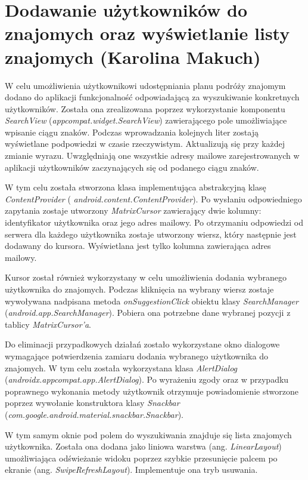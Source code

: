 \documentclass[10pt,twoside,a4paper]{report}
\begin{document}
\section{Dodawanie użytkowników do znajomych oraz wyświetlanie listy znajomych (Karolina Makuch)}
\par W celu umożliwienia użytkownikowi udostępniania planu podróży znajomym dodano do aplikacji funkcjonalność odpowiadającą za wyszukiwanie konkretnych użytkowników. Została ona zrealizowana poprzez  wykorzystanie komponentu \textit{SearchView} (\textit{appcompat.widget.SearchView}) zawierającego pole umożliwiające wpisanie ciągu znaków. Podczas wprowadzania kolejnych liter zostają wyświetlane podpowiedzi w czasie rzeczywistym. Aktualizują się  przy każdej zmianie wyrazu. Uwzględniają one wszystkie adresy mailowe zarejestrowanych w aplikacji użytkowników zaczynających się od podanego ciągu znaków.
\par W tym celu została stworzona klasa implementująca abstrakcyjną klasę \textit{ContentProvider} ( \textit{android.content.ContentProvider}). Po wysłaniu odpowiedniego zapytania zostaje utworzony \textit{MatrixCursor} zawierający dwie kolumny: identyfikator użytkownika oraz jego adres mailowy. Po otrzymaniu odpowiedzi od serwera dla każdego użytkownika zostaje utworzony wiersz, który następnie jest dodawany do kursora. Wyświetlana jest tylko kolumna zawierająca adres mailowy.
\par Kursor został również wykorzystany w celu umożliwienia dodania wybranego użytkownika do znajomych. Podczas kliknięcia na wybrany wiersz zostaje wywoływana nadpisana metoda \textit{onSuggestionClick} obiektu klasy \textit{SearchManager} (\textit{android.app.SearchManager}). Pobiera ona potrzebne dane wybranej pozycji z tablicy \textit{MatrixCursor’a}.
\par Do eliminacji przypadkowych działań zostało wykorzystane okno dialogowe wymagające potwierdzenia  zamiaru dodania wybranego użytkownika do znajomych. W tym celu została wykorzystana klasa \textit{AlertDialog} (\textit{androidx.appcompat.app.AlertDialog}). Po wyrażeniu zgody  oraz w przypadku poprawnego wykonania metody użytkownik otrzymuje powiadomienie stworzone poprzez wywołanie konstruktora klasy \textit{Snackbar} (\textit{com.google.android.material.snackbar.Snackbar}).
\par W tym samym oknie pod polem do wyszukiwania znajduje się lista znajomych użytkownika. Została ona dodana jako liniowa warstwa (ang. \textit{LinearLayout}) umożliwiająca odświeżanie widoku poprzez szybkie przesunięcie palcem po ekranie (ang. \textit{SwipeRefreshLayout}). Implementuje ona tryb usuwania.
\end{document}
